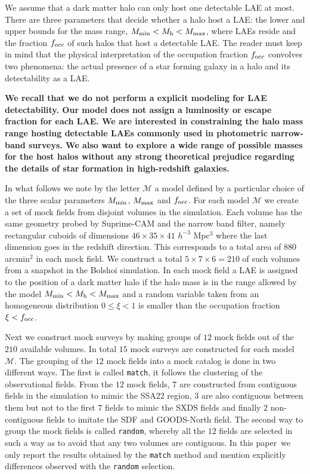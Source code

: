 \documentclass[usenatbib]{mn2e}
\newcommand{\documentname}{paper~}
\begin{document}
We assume that a dark matter halo can only host one
detectable LAE at most.  There are three parameters that
decide whether a halo host a LAE: the lower and upper bounds for the
mass range, $M_{\rm min}< M_{\rm h} < M_{\rm max}$, where LAEs reside and the fraction $f_{\rm occ}$ of such halos that host a detectable LAE. The reader
must keep in mind that the physical interpretation of the occupation
fraction $f_{\rm occ}$ convolves two phenomena: the actual presence of a star
forming galaxy in a halo and its detectability as a LAE.

{\bf We recall that we do not perform a explicit modeling for LAE
detectability. Our model does not assign a luminosity or escape
fraction for each LAE. We are interested in constraining the halo
mass range hosting detectable LAEs commonly used in photometric
narrow-band surveys. We also want to explore a wide range of
possible masses for the host halos without any strong theoretical
prejudice regarding the details of star formation in high-redshift
galaxies. }


In what follows we note by the letter ${\mathcal M}$ a model
defined by a particular choice of the three scalar parameters $M_{\rm
  min}$, $M_{\rm  max}$ and $f_{\rm occ}$. For each model ${\mathcal
  M}$ we create a set of mock fields from disjoint volumes in the
simulation. Each volume has the same geometry probed by Suprime-CAM
and the narrow band filter, namely rectangular cuboids of dimensions
$46\times 35\times 41$ $h^{-3}$ Mpc$^{3}$ where the last dimension goes
in the redshift direction. This corresponds to a total area of $880$
arcmin$^{2}$ in each mock field. We construct a total $5\times 7
\times 6=210$ of such volumes from a snapshot in the Bolshoi
simulation. In each mock field a LAE is assigned to the position of a
dark matter halo if the halo mass is in the range allowed by the model
$M_{\rm min}<M_{\rm h}<M_{\rm max}$ and a random variable taken from
an homogeneous distribution $0\leq \xi<1$ is smaller than the occupation
fraction $\xi<f_{\rm occ}$.

Next we construct mock surveys by making groups of $12$ mock fields
out of the $210$ available volumes. In total $15$ mock surveys are
constructed for each model $\mathcal{M}$. The grouping of the $12$
mock fields into a mock catalog is done in two different ways. The
first is called {\texttt{match}}, it follows the clustering of the
observational fields. From the $12$ mock fields, $7$ are constructed
from contiguous fields in the simulation to mimic the SSA22 region,
$3$ are also contiguous between them but not to the first $7$ fields
to mimic the SXDS fields and finally $2$ non-contiguous fields to
imitate the SDF and GOODS-North field.   The second way to group the
mock fields is called {\texttt{random}}, whereby all the $12$ fields
are selected in such a way as to avoid that any two volumes are
contiguous. In this \documentname we only report the results obtained
by the {\texttt{match}} method and mention explicitly differences
observed with the {\texttt{random}} selection. 
\end{document}
